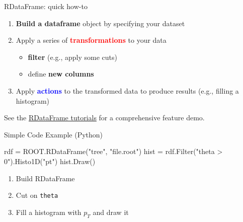 \documentclass[aspectratio=169]{beamer}
\begin{document}
\begin{frame}[fragile]{RDataFrame: quick how-to}
    \begin{enumerate}
        \item \textbf{Build a dataframe} object by specifying your dataset
        \item Apply a series of \textcolor{red}{\textbf{transformations}} to your data
        \begin{itemize}
            \item \textbf{filter} (e.g., apply some cuts)
            \item define \textbf{new columns}
        \end{itemize}
    \item Apply \textcolor{blue}{\textbf{actions}} to the transformed data to produce results (e.g., filling a histogram)
    \end{enumerate}
\vspace{0.5cm}
See the \href{https://root.cern.ch/doc/master/group__tutorial__dataframe.html}{RDataFrame tutorials} for a comprehensive feature demo.
\end{frame}

\begin{frame}[fragile]{Simple Code Example (Python)}
    \begin{pycell}
rdf = ROOT.RDataFrame("tree", "file.root")
hist = rdf.Filter("theta > 0").Histo1D("pt")
hist.Draw()
    \end{pycell}
    \begin{enumerate}
        \item Build RDataFrame
        \item Cut on \texttt{theta}
        \item Fill a histogram with $p_T$ and draw it
    \end{enumerate}
\end{frame}
\end{document}

